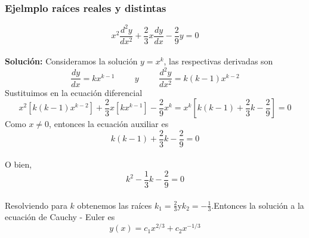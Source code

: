 \documentclass[12pt,letterpaper]{article}
\begin{document}
\subsubsection{Ejelmplo raíces reales y distintas}
$$x^{2}\frac{d^{2}y}{dx^{2}}+\frac{2}{3}x\frac{dy}{dx}-\frac{2}{9}y=0$$\\
\textbf{Solución:} Consideramos la solución $y=x^{k}$, las respectivas derivadas son\\
$$\frac{dy}{dx}=kx^{k-1}\hspace{1cm}y\hspace{1cm}\frac{d^{2}y}{dx^{2}}=k(k-1)x^{k-2}$$
Sustituimos en la ecuación diferencial\\
$$x^{2}\left[k(k-1)x^{k-2}\right]+\frac{2}{3}x\left[kx^{k-1}\right]-\frac{2}{9}x^{k}=x^{k}\left[k(k-1)+\frac{2}{3}k-\frac{2}{9}\right]=0$$
Como $x\neq 0$, entonces la ecuación auxiliar es\\
$$k(k-1)+\frac{2}{3}k-\frac{2}{9}=0$$\\
O bien,
$$k^{2}-\frac{1}{3}k-\frac{2}{9}=0$$\\
Resolviendo para $k$ obtenemos las raíces $k_{1}=\frac{2}{3}$y$k_{2}=-\frac{1}{3}$.Entonces la solución a la ecuación de Cauchy - Euler es
$$y(x)=c_{1}x^{2/3}+c_{2}x^{-1/3}$$\\
\end{document}
